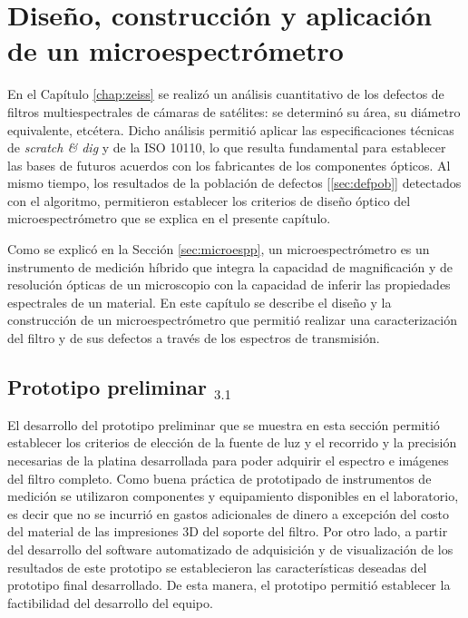 \singlespacing
\chapter{Diseño, construcción y aplicación de un microespectrómetro}
\label{chap:microsp}

\hspace{0.5cm}En el Capítulo \ref{chap:zeiss} se realizó un análisis cuantitativo de los defectos de filtros multiespectrales de cámaras de satélites: se determinó su área, su diámetro equivalente, etcétera. Dicho análisis permitió aplicar las especificaciones técnicas de \textit{scratch \& dig} y de la ISO 10110, lo que resulta fundamental para establecer las bases de futuros acuerdos con los fabricantes de los componentes ópticos. Al mismo tiempo, los resultados de la población de defectos [\ref{sec:defpob}] detectados con el algoritmo, permitieron establecer los criterios de diseño óptico del microespectrómetro que se explica en el presente capítulo.

Como se explicó en la Sección \ref{sec:microespp}, un microespectrómetro es un instrumento de medición híbrido que integra la capacidad de magnificación y de resolución ópticas de un microscopio con la capacidad de inferir las propiedades espectrales de un material. En este capítulo se describe el diseño y la construcción de un microespectrómetro que permitió realizar una caracterización del filtro y de sus defectos a través de los espectros de transmisión.

\singlespacing
\section{Prototipo preliminar \href{https://github.com/jrr1984/Prototipo0\_S-D\_SpectralGUI}{\faGithub$_{3.1}$}}
\label{sec:prot0}

\hspace{0.5cm}El desarrollo del prototipo preliminar que se muestra en esta sección permitió establecer los criterios de elección de la fuente de luz y el recorrido y la precisión necesarias de la platina desarrollada para poder adquirir el espectro e imágenes del filtro completo. Como buena práctica de prototipado de instrumentos de medición se utilizaron componentes y equipamiento disponibles en el laboratorio, es decir que no se incurrió en gastos adicionales de dinero a excepción del costo del material de las impresiones 3D del soporte del filtro. Por otro lado, a partir del desarrollo del software automatizado de adquisición y de visualización de los resultados de este prototipo se establecieron las características deseadas del prototipo final desarrollado. De esta manera, el prototipo permitió establecer la factibilidad del desarrollo del equipo.

